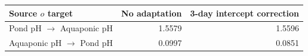 \begin{tabular}{lrr}
\toprule
Source $	o$ target & No adaptation & 3-day intercept correction \\
\midrule
Pond pH $\to$ Aquaponic pH & 1.5579 & 1.5596 \\
Aquaponic pH $\to$ Pond pH & 0.0997 & 0.0851 \\
\bottomrule
\end{tabular}